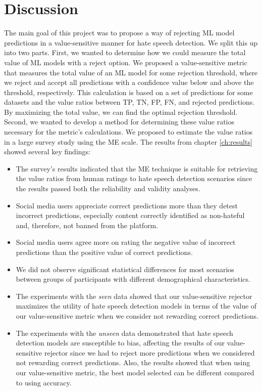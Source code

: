 \chapter{Discussion}
\label{ch:discussion}
The main goal of this project was to propose a way of rejecting ML model predictions in a value-sensitive manner for hate speech detection.
%
We split this up into two parts.
%
First, we wanted to determine how we could measure the total value of ML models with a reject option.
%
We proposed a value-sensitive metric that measures the total value of an ML model for some rejection threshold, where we reject and accept all predictions with a confidence value below and above the threshold, respectively.
%
This calculation is based on a set of predictions for some datasets and the value ratios between TP, TN, FP, FN, and rejected predictions.
%
By maximizing the total value, we can find the optimal rejection threshold.
%
Second, we wanted to develop a method for determining these value ratios necessary for the metric's calculations.
%
We proposed to estimate the value ratios in a large survey study using the ME scale.
%
The results from chapter \ref{ch:results} showed several key findings:
\begin{itemize}
    \item The survey's results indicated that the ME technique is suitable for retrieving the value ratios from human ratings to hate speech detection scenarios since the results passed both the reliability and validity analyses.
    \item Social media users appreciate correct predictions more than they detest incorrect predictions, especially content correctly identified as non-hateful and, therefore, not banned from the platform.
    \item Social media users agree more on rating the negative value of incorrect predictions than the positive value of correct predictions.
    \item We did not observe significant statistical differences for most scenarios between groups of participants with different demographical characteristics.
    \item The experiments with the \emph{seen} data showed that our value-sensitive rejector maximizes the utility of hate speech detection models in terms of the value of our value-sensitive metric when we consider not rewarding correct predictions.
    \item The experiments with the \emph{unseen} data demonstrated that hate speech detection models are susceptible to bias, affecting the results of our value-sensitive rejector since we had to reject more predictions when we considered not rewarding correct predictions. Also, the results showed that when using our value-sensitive metric, the best model selected can be different compared to using accuracy.
\end{itemize}
%

